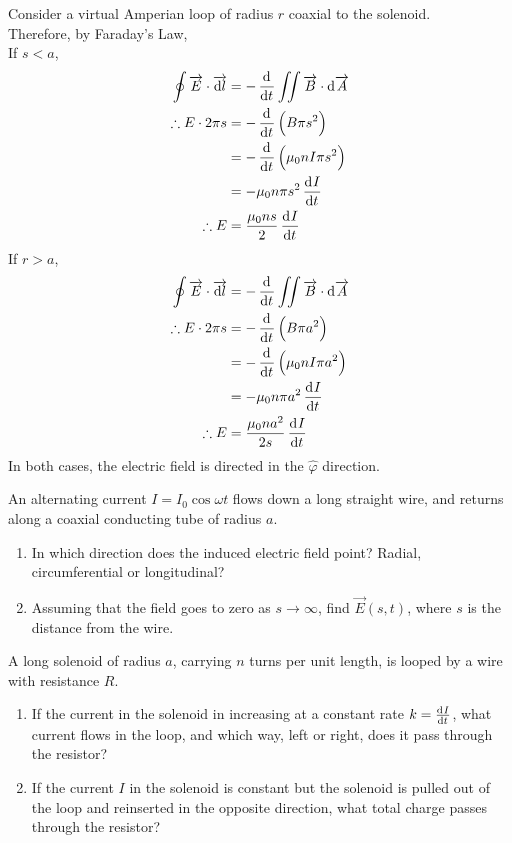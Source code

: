 \documentclass[fleqn, a4paper, 11pt, oneside]{amsart}
\theoremstyle{definition}
\theoremstyle{theorem}
\begin{document}
\begin{solution}
	Consider a virtual Amperian loop of radius $r$ coaxial to the solenoid.\\
	Therefore, by Faraday's Law,\\
	If $s < a$,
	\begin{align*}
		\oint \overrightarrow{E} \cdot \overrightarrow{\dif l} &= -\dod{}{t}\iint \overrightarrow{B} \cdot \dif \overrightarrow{A}\\
		\therefore E \cdot 2 \pi s &= -\dod{}{t}\left( B \pi s^2 \right)\\
		&= -\dod{}{t}\left( \mu_0 n I \pi s^2 \right)\\
		&= -\mu_0 n \pi s^2 \dod{I}{t}\\
		\therefore E &= \frac{\mu_0 n s}{2} \dod{I}{t}
	\end{align*}
	If $r > a$,
	\begin{align*}
		\oint \overrightarrow{E} \cdot \overrightarrow{\dif l} &= -\dod{}{t}\iint \overrightarrow{B} \cdot \dif \overrightarrow{A}\\
		\therefore E \cdot 2 \pi s &= -\dod{}{t}\left( B \pi a^2 \right)\\
		&= -\dod{}{t}\left( \mu_0 n I \pi a^2 \right)\\
		&= -\mu_0 n \pi a^2 \dod{I}{t}\\
		\therefore E &= \frac{\mu_0 n a^2}{2 s} \dod{I}{t}
	\end{align*}
	In both cases, the electric field is directed in the $\hat{\varphi}$ direction.
\end{solution}

\begin{question}
	An alternating current $I = I_0 \cos \omega t$ flows down a long straight wire, and returns along a coaxial conducting tube of radius $a$.
	\begin{enumerate}
		\item
			In which direction does the induced electric field point?
			Radial, circumferential or longitudinal?
		\item Assuming that the field goes to zero as $s \to \infty$, find $\overrightarrow{E}(s,t)$, where $s$ is the distance from the wire.
	\end{enumerate}
\end{question}

\begin{question}
	A long solenoid of radius $a$, carrying $n$ turns per unit length, is looped by a wire with resistance $R$.
	\begin{enumerate}
		\item If the current in the solenoid in increasing at a constant rate $k = \od{I}{t}$, what current flows in the loop, and which way, left or right, does it pass through the resistor?
		\item If the current $I$ in the solenoid is constant but the solenoid is pulled out of the loop and reinserted in the opposite direction, what total charge passes through the resistor?
	\end{enumerate}
\end{question}
\end{document}
